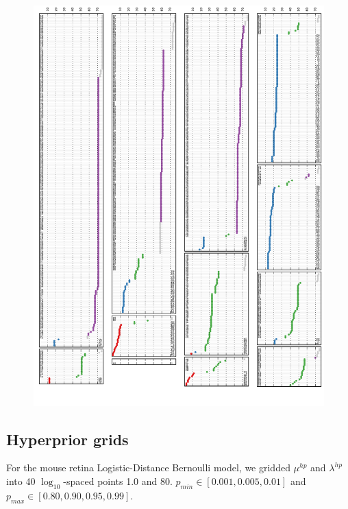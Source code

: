 \documentclass{article}
\begin{document}
\begin{figure}[h!]

  \centering 
    \centerline{\includegraphics[width=6.5in]{mouseretina/retina.1.2.ld.0.0.data-fixed_20_100-anneal_slow_400.truth_latent.pdf}}
  \caption{}
\label{fig:supp:retinaldclusters}
\end{figure}

\newpage

\FloatBarrier
\subsection{Hyperprior grids}
\label{supp:hyperpriors}

For the mouse retina Logistic-Distance Bernoulli model, we gridded $\mu^{hp}$ and $\lambda^{hp}$ into 40 $\log_{10}$-spaced points 1.0 and 80. $p_{min} \in [0.001, 0.005, 0.01]$ and $p_{max} \in [0.80, 0.90, 0.95, 0.99]$.
\end{document}
